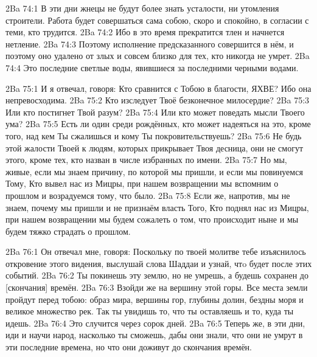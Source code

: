 \vs 2Ba 74:1
В эти дни жнецы не будут более знать усталости, ни утомления строители. Работа будет совершаться сама собою, скоро и спокойно, в согласии с теми, кто трудится.
\vs 2Ba 74:2
Ибо в это время прекратится тлен и начнется нетление.
\vs 2Ba 74:3
Поэтому исполнение предсказанного совершится в нём, и поэтому оно удалено от злых и совсем близко для тех, кто никогда не умрет.
\vs 2Ba 74:4
Это последние светлые воды, явившиеся за последними черными водами.

\vs 2Ba 75:1
И я отвечал, говоря: Кто сравнится с Тобою в благости, ЯХВЕ? Ибо она непревосходима.
\vs 2Ba 75:2
Кто изследует Твоё безконечное милосердие?
\vs 2Ba 75:3
Или кто постигнет Твой разум?
\vs 2Ba 75:4
Или кто может поведать мысли Твоего ума?
\vs 2Ba 75:5
Есть ли один среди рождённых, кто может надеяться на это, кроме того, над кем Ты сжалишься и кому Ты покровительствуешь?
\vs 2Ba 75:6
Не будь этой жалости Твоей к людям, которых прикрывает Твоя десница, они не смогут этого, кроме тех, кто назван в числе избранных по имени.
\vs 2Ba 75:7
Но мы, живые, если мы знаем причину, по которой мы пришли, и если мы повинуемся Тому, Кто вывел нас из Мицры, при нашем возвращении мы вспомним о прошлом и возрадуемся тому, что было.
\vs 2Ba 75:8
Если же, напротив, мы не знаем, почему мы пришли и не признаём власть Того, Кто поднял нас из Мицры, при нашем возвращении мы будем сожалеть о том, что происходит ныне и мы будем тяжко страдать о прошлом.

\vs 2Ba 76:1
Он отвечал мне, говоря: Поскольку по твоей молитве тебе изъяснилось откровение этого видения, выслушай слова Шаддаи и узнай, чтo будет после этих событий.
\vs 2Ba 76:2
Ты покинешь эту землю, но не умрешь, а будешь сохранен до [скончания] времён.
\vs 2Ba 76:3
Взойди же на вершину этой горы. Все места земли пройдут перед тобою: образ мира, вершины гор, глубины долин, бездны моря и великое множество рек. Так ты увидишь то, что ты оставляешь и то, куда ты идешь.
\vs 2Ba 76:4
Это случится через сорок дней.
\vs 2Ba 76:5
Теперь же, в эти дни, иди и научи народ, насколько ты сможешь, дабы они знали, что они не умрут в эти последние времена, но что они доживут до скончания времён.

